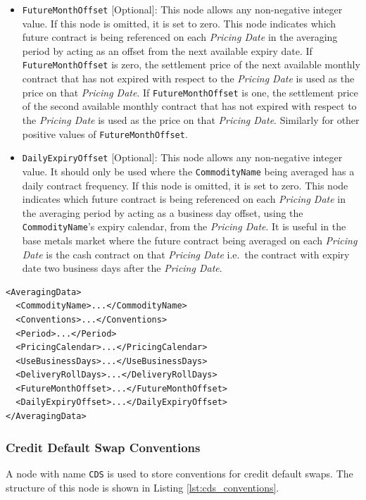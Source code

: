 \begin{itemize}
\item \lstinline!FutureMonthOffset! [Optional]: This node allows any non-negative integer value. If this node is omitted, it is set to zero. This node indicates which future contract is being referenced on each \textit{Pricing Date} in the averaging period by acting as an offset from the next available expiry date. If \lstinline!FutureMonthOffset! is zero, the settlement price of the next available monthly contract that has not expired with respect to the \textit{Pricing Date} is used as the price on that \textit{Pricing Date}. If \lstinline!FutureMonthOffset! is one, the settlement price of the second available monthly contract that has not expired with respect to the \textit{Pricing Date} is used as the price on that \textit{Pricing Date}. Similarly for other positive values of \lstinline!FutureMonthOffset!.
\item \lstinline!DailyExpiryOffset! [Optional]: This node allows any non-negative integer value. It should only be used where the \lstinline!CommodityName! being averaged has a daily contract frequency. If this node is omitted, it is set to zero. This node indicates which future contract is being referenced on each \textit{Pricing Date} in the averaging period by acting as a business day offset, using the \lstinline!CommodityName!'s expiry calendar, from the \textit{Pricing Date}. It is useful in the base metals market where the future contract being averaged on each \textit{Pricing Date} is the cash contract on that \textit{Pricing Date} i.e.\ the contract with expiry date two business days after the \textit{Pricing Date}.
\end{itemize}

\begin{listing}[h!]
\begin{verbatim}
<AveragingData>
  <CommodityName>...</CommodityName>
  <Conventions>...</Conventions>
  <Period>...</Period>
  <PricingCalendar>...</PricingCalendar>
  <UseBusinessDays>...</UseBusinessDays>
  <DeliveryRollDays>...</DeliveryRollDays>
  <FutureMonthOffset>...</FutureMonthOffset>
  <DailyExpiryOffset>...</DailyExpiryOffset>
</AveragingData>
\end{verbatim}
\caption{\lstinline!AveragingData! node structure}
\label{lst:ave_data_comm_future_convention}
\end{listing}



\subsubsection{Credit Default Swap Conventions}
\label{sss:cds_conventions}
A node with name \lstinline!CDS! is used to store conventions for credit default swaps. The structure of this node is shown in Listing \ref{lst:cds_conventions}.

